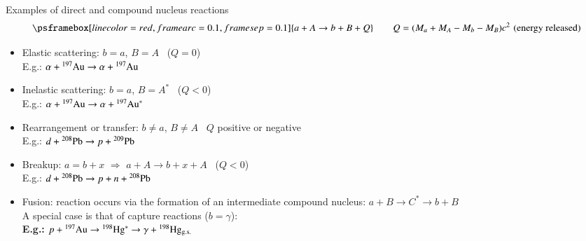 \documentclass[english,10pt]{beamer}
\newcommand{\gitem}[1]{\item {\textcolor{deepcarmine}{  #1}}}
\begin{document}
\begin{frame}{Examples of direct and compound nucleus reactions}
$$
\psframebox[linecolor=red,framearc=0.1,framesep=0.1]{
a + A  \rightarrow  b + B  + Q 
}%
\quad \quad Q= (M_a + M_A - M_b - M_B) c^2 \,\, (\text{energy released})
$$

\begin{itemize}
\setlength{\itemsep}{10pt}
    \gitem{Elastic scattering}: $b=a$, $B=A$ \,  ($Q=0$) \\
    E.g.: $\alpha+ {\rm ^{197}Au} \rightarrow \alpha+ {\rm ^{197}Au} $   
    
    \gitem{Inelastic scattering}: $b=a$, $B=A^*$ \,  ($Q<0$)  \\
    E.g.: $\alpha+ {\rm ^{197}Au} \rightarrow \alpha+ {\rm ^{197}Au^*} $   
 
   \gitem{Rearrangement or transfer}: $b \neq a$, $B \neq A$  \, $Q$ positive or negative \\
     E.g.: $d+ {\rm ^{208}Pb} \rightarrow p+ {\rm ^{209}Pb} $   

   \gitem{Breakup}: $a=b+x$ $\Rightarrow$  $a + A \rightarrow b + x + A$ \, ($Q<0$) \\
    E.g.: $d+ {\rm ^{208}Pb} \rightarrow p+ n + {\rm ^{208}Pb} $   
   
   \gitem{Fusion}: reaction occurs via the formation of an intermediate compound nucleus: $a+ B \rightarrow C^* \rightarrow b + B$  \\
   A special case is that of {\verde capture} reactions ($b=\gamma$): \\
   {\bf E.g.:} $p+ {\rm ^{197}Au} \rightarrow {\rm ^{198}Hg^*}  \rightarrow \gamma + {\rm ^{198}Hg_{g.s.}} $   
   

   
\end{itemize}    

\end{frame}
\end{document}
